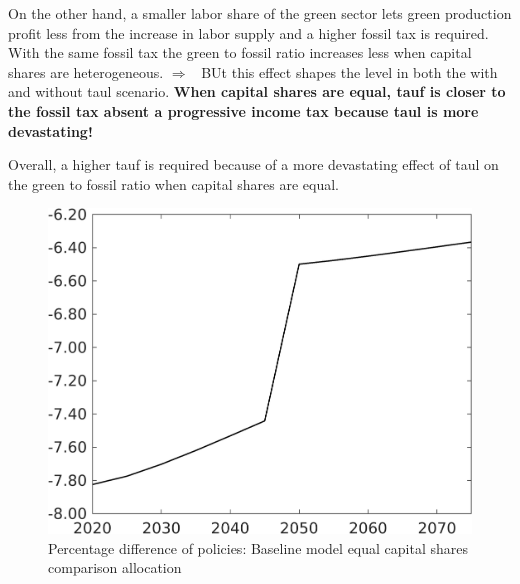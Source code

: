 \documentclass[12pt]{article}
\newcommand{\ar}{$\Rightarrow$ \ }
\begin{document}
On the other hand, a smaller labor share of the green sector lets green production profit less from the increase in labor supply and a higher fossil tax is required. With the same fossil tax the green to fossil ratio increases less when capital shares are heterogeneous. \ar BUt this effect shapes the level in both the with and without taul scenario.\textbf{  
When capital shares are equal, tauf is closer to the fossil tax absent a progressive income tax because taul is more devastating!}

Overall, a higher tauf is required because of a more devastating effect of taul on the green to fossil ratio when capital shares are equal. 
\begin{figure}[h!!]
	\centering
	\caption{Percentage difference of policies: Baseline model equal capital shares comparison allocation}\label{fig:Pertauf_nsk0_xgr0_equal}
	\begin{minipage}[]{0.32\textwidth}
		\includegraphics[width=1\textwidth]{../../codding_model/own_basedOnFried/optimalPol_010922_revision/figures/all_13Sept22/CompTaufPER_bytaul_Equlab_Reg0_tauf_spillover0_nsk0_xgr0_knspil0_sep1_LFlimit1_emsbase0_countec0_GovRev0_etaa0.79_lgd0.png}
	\end{minipage}		
	\begin{minipage}[]{0.32\textwidth}

\end{minipage}
\end{figure}
\end{document}

